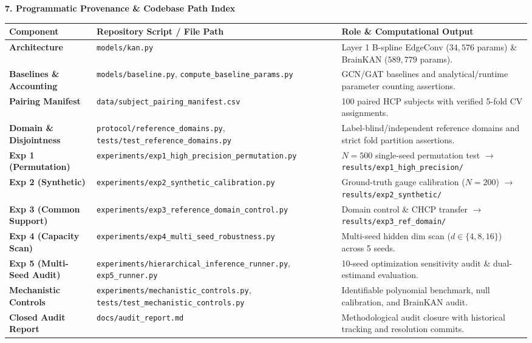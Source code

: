 \documentclass[9pt]{article}
\begin{document}
\textbf{\large 7. Programmatic Provenance \& Codebase Path Index}\\[1pt]
\begin{table}[h!]
\centering
\scriptsize
\begin{tabularx}{\textwidth}{l p{5.2cm} X}
\toprule
\textbf{Component} & \textbf{Repository Script / File Path} & \textbf{Role \& Computational Output} \\
\midrule
\textbf{Architecture} & \nolinkurl{models/kan.py} & Layer 1 B-spline EdgeConv ($34,576$ params) \& BrainKAN ($589,779$ params). \\
\textbf{Baselines \& Accounting} & \nolinkurl{models/baseline.py}, \nolinkurl{compute_baseline_params.py} & GCN/GAT baselines and analytical/runtime parameter counting assertions. \\
\textbf{Pairing Manifest} & \nolinkurl{data/subject_pairing_manifest.csv} & 100 paired HCP subjects with verified 5-fold CV assignments. \\
\textbf{Domain \& Disjointness} & \nolinkurl{protocol/reference_domains.py}, \nolinkurl{tests/test_reference_domains.py} & Label-blind/independent reference domains and strict fold partition assertions. \\
\textbf{Exp 1 (Permutation)} & \nolinkurl{experiments/exp1_high_precision_permutation.py} & $N=500$ single-seed permutation test $\to$ \nolinkurl{results/exp1_high_precision/} \\
\textbf{Exp 2 (Synthetic)} & \nolinkurl{experiments/exp2_synthetic_calibration.py} & Ground-truth gauge calibration ($N=200$) $\to$ \nolinkurl{results/exp2_synthetic/} \\
\textbf{Exp 3 (Common Support)} & \nolinkurl{experiments/exp3_reference_domain_control.py} & Domain control \& CHCP transfer $\to$ \nolinkurl{results/exp3_ref_domain/} \\
\textbf{Exp 4 (Capacity Scan)} & \nolinkurl{experiments/exp4_multi_seed_robustness.py} & Multi-seed hidden dim scan ($d \in \{4, 8, 16\}$) across 5 seeds. \\
\textbf{Exp 5 (Multi-Seed Audit)} & \nolinkurl{experiments/hierarchical_inference_runner.py}, \nolinkurl{exp5_runner.py} & 10-seed optimization sensitivity audit \& dual-estimand evaluation. \\
\textbf{Mechanistic Controls} & \nolinkurl{experiments/mechanistic_controls.py}, \nolinkurl{tests/test_mechanistic_controls.py} & Identifiable polynomial benchmark, null calibration, and BrainKAN audit. \\
\textbf{Closed Audit Report} & \nolinkurl{docs/audit_report.md} & Methodological audit closure with historical tracking and resolution commits. \\
\bottomrule
\end{tabularx}
\end{table}
\end{document}
